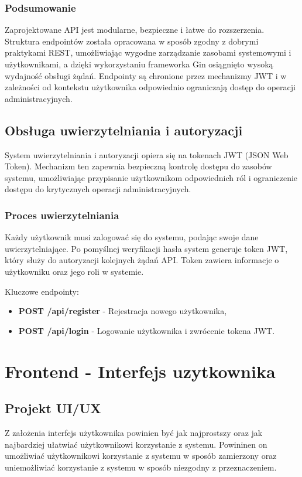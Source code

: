 \subsubsection{Podsumowanie}
Zaprojektowane API jest modularne, bezpieczne i łatwe do rozszerzenia. Struktura endpointów została opracowana w sposób zgodny z dobrymi praktykami REST, umożliwiając wygodne zarządzanie zasobami systemowymi i użytkownikami, a dzięki wykorzystaniu frameworka Gin osiągnięto wysoką wydajność obsługi żądań. Endpointy są chronione przez mechanizmy JWT i w zależności od kontekstu użytkownika odpowiednio ograniczają dostęp do operacji administracyjnych.


\subsection{Obsługa uwierzytelniania i autoryzacji}

System uwierzytelniania i autoryzacji opiera się na tokenach JWT (JSON Web Token). Mechanizm ten zapewnia bezpieczną kontrolę dostępu do zasobów systemu, umożliwiając przypisanie użytkownikom odpowiednich ról i ograniczenie dostępu do krytycznych operacji administracyjnych.

\subsubsection{Proces uwierzytelniania}
Każdy użytkownik musi zalogować się do systemu, podając swoje dane uwierzytelniające. Po pomyślnej weryfikacji hasła system generuje token JWT, który służy do autoryzacji kolejnych żądań API. Token zawiera informacje o użytkowniku oraz jego roli w systemie.

Kluczowe endpointy:
\begin{itemize}
    \item \textbf{POST /api/register} - Rejestracja nowego użytkownika,
    \item \textbf{POST /api/login} - Logowanie użytkownika i zwrócenie tokena JWT.
\end{itemize}
\newpage
\section{Frontend - Interfejs uzytkownika}

\subsection{Projekt UI/UX}

Z założenia interfejs użytkownika powinien być jak najprostszy oraz jak najbardziej ułatwiać użytkownikowi korzystanie z systemu. Powininen on umożliwiać użytkownikowi korzystanie z systemu w sposób zamierzony oraz uniemożliwiać korzystanie z systemu w sposób niezgodny z przeznaczeniem.
